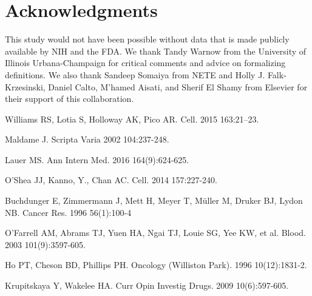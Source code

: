 \documentclass[10pt,letterpaper]{article}
\begin{document}
 \nolinenumbers
 
 \section*{Acknowledgments} This study would not have been possible without data that is made publicly available by NIH and the FDA. We thank Tandy Warnow from the University of Illinois Urbana-Champaign for critical comments and advice on formalizing definitions. We also thank Sandeep Somaiya from NETE and Holly J. Falk-Krzesinski, Daniel Calto, M'hamed Aisati, and Sherif El Shamy from Elsevier for their support of this collaboration.
 
\begin{thebibliography}{10}

Williams RS, Lotia S, Holloway AK, Pico AR.
\newblock Cell. 2015 163:21--23.

Maldame J.
\newblock Scripta Varia 2002 104:237-248.

Lauer MS.
\newblock Ann Intern Med. 2016 164(9):624-625.

O'Shea JJ, Kanno, Y., Chan AC.
\newblock Cell. 2014 157:227-240.

Buchdunger E, Zimmermann J, Mett H, Meyer T, M\"uller M, Druker BJ, Lydon NB.
\newblock Cancer Res. 1996 56(1):100-4

O'Farrell AM, Abrams TJ, Yuen HA, Ngai TJ, Louie SG, Yee KW, et al. 
\newblock Blood. 2003 101(9):3597-605.

Ho PT, Cheson BD, Phillips PH.
\newblock Oncology (Williston Park). 1996 10(12):1831-2.

Krupitskaya Y, Wakelee HA.
\newblock Curr Opin Investig Drugs. 2009 10(6):597-605.


\end{thebibliography}
\end{document}
